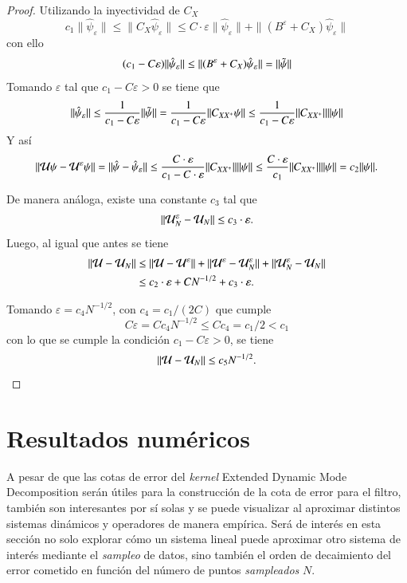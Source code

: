 \begin{proof}
    Utilizando la inyectividad de $C_X$
    \[
    c_1 \|\hat{\psi}_\varepsilon\| \leq \| C_X \hat{\psi}_\varepsilon \| \leq  C \cdot \varepsilon  \| \hat{\psi}_\varepsilon \| + \| (B^\varepsilon + C_X)\hat{\psi}_\varepsilon\|
    \]
    con ello
    \[
    (c_1 - C\varepsilon)  \|\hat{\psi}_\varepsilon\| \leq \| (B^\varepsilon + C_X)\hat{\psi}_\varepsilon\| = \| \Tilde{\psi} \|
    \]
    Tomando $\varepsilon$ tal que $c_1 - C \varepsilon > 0$ se tiene que
    \[
    \|\hat{\psi}_\varepsilon\| \leq \frac{1}{c_1 - C\varepsilon} \| \Tilde{\psi} \| = \frac{1}{c_1 - C\varepsilon} \| C_{XX^+} \psi \| \leq \frac{1}{c_1 - C\varepsilon} \| C_{XX^+} \| \| \psi \|
    \]
    Y así
    \[
     \| \mathcal{U}\psi - \mathcal{U}^\varepsilon\psi \| = \| \hat{\psi} - \hat{\psi}_\varepsilon \| \leq \frac{C \cdot \varepsilon}{c_1 - C \cdot \varepsilon} \| C_{XX^+} \| \| \psi \| \leq \frac{C \cdot \varepsilon}{c_1} \| C_{XX^+} \| \| \psi \| = c_2 \| \psi \|.
    \]

    De manera análoga, existe una constante $c_3$ tal que 
    \[
    \| \mathcal{U}^\varepsilon_N - \mathcal{U}_N \| \leq c_3 \cdot \varepsilon.
    \]
    Luego, al igual que antes se tiene
    \[
    \begin{aligned}
        \| \mathcal{U} - \mathcal{U}_N \| & \leq \| \mathcal{U} - \mathcal{U}^\varepsilon \| + \| \mathcal{U}^\varepsilon - \mathcal{U}_N^\varepsilon \| + \| \mathcal{U}_N^\varepsilon - \mathcal{U}_N \| \\
        & \leq c_2 \cdot \varepsilon + C N^{-1/2} + c_3 \cdot \varepsilon.
    \end{aligned}
    \]

   Tomando $\varepsilon = c_4 N^{-1/2}$, con $c_4 = c_1/(2C)$ que cumple
   \[
   C  \varepsilon = C c_4 N^{-1/2} \leq C c_4 = c_1/2 < c_1
   \]
   con lo que se cumple la condición $c_1 - C  \varepsilon > 0$, se tiene
   \[
   \| \mathcal{U} - \mathcal{U}_N \| \leq c_5 N^{-1/2}.
   \]
\end{proof}

\section{Resultados numéricos}

A pesar de que las cotas de error del \textit{kernel} Extended Dynamic Mode Decomposition serán útiles para la construcción de la cota de error para el filtro, también son interesantes por sí solas y se puede visualizar al aproximar distintos sistemas dinámicos y operadores de manera empírica.
Será de interés en esta sección no solo explorar cómo un sistema lineal puede aproximar otro sistema de interés mediante el \textit{sampleo} de datos, sino también el orden de decaimiento del error cometido en función del número de puntos \textit{sampleados} $N$.

